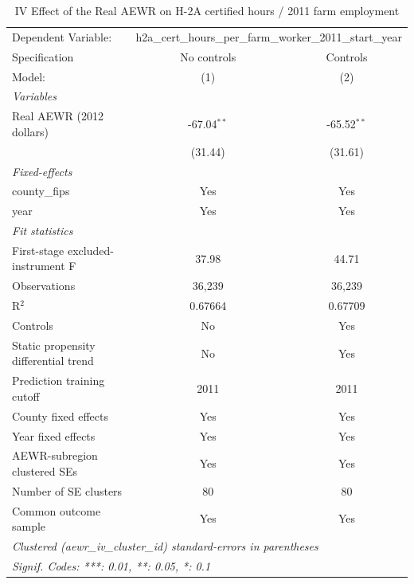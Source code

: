 
\begin{table}[htbp]
   \caption{\label{tab:iv_h2a_certified_hours} IV Effect of the Real AEWR on H-2A certified hours / 2011 farm employment}
   \centering
   \begin{tabular}{lcc}
      \tabularnewline \midrule \midrule
      Dependent Variable: & \multicolumn{2}{c}{h2a\_cert\_hours\_per\_farm\_worker\_2011\_start\_year}\\
      Specification                        & No controls   & Controls \\
      Model:                               & (1)           & (2)\\
      \midrule
      \emph{Variables}\\
      Real AEWR (2012 dollars)             & -67.04$^{**}$ & -65.52$^{**}$\\
                                           & (31.44)       & (31.61)\\
      \midrule
      \emph{Fixed-effects}\\
      county\_fips                         & Yes           & Yes\\
      year                                 & Yes           & Yes\\
      \midrule
      \emph{Fit statistics}\\
      First-stage excluded-instrument F    & 37.98         & 44.71\\
      Observations                         & 36,239        & 36,239\\
      R$^2$                                & 0.67664       & 0.67709\\
      Controls                             & No            & Yes\\
      Static propensity differential trend & No            & Yes\\
      Prediction training cutoff           & 2011          & 2011\\
      County fixed effects                 & Yes           & Yes\\
      Year fixed effects                   & Yes           & Yes\\
      AEWR-subregion clustered SEs         & Yes           & Yes\\
      Number of SE clusters                & 80            & 80\\
      Common outcome sample                & Yes           & Yes\\
      \midrule \midrule
      \multicolumn{3}{l}{\emph{Clustered (aewr\_iv\_cluster\_id) standard-errors in parentheses}}\\
      \multicolumn{3}{l}{\emph{Signif. Codes: ***: 0.01, **: 0.05, *: 0.1}}\\
   \end{tabular}


\end{table}
